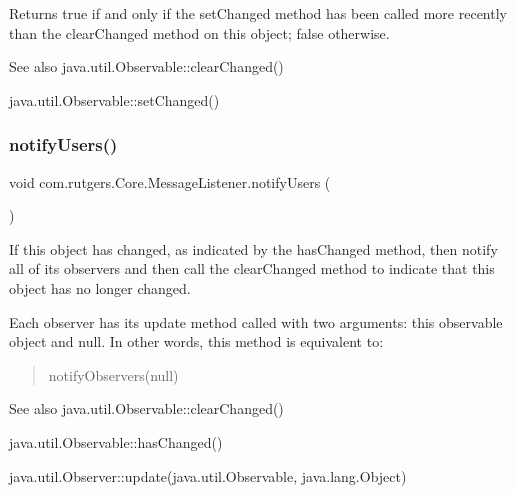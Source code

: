 \begin{DoxyReturn}{Returns}
{\ttfamily true} if and only if the {\ttfamily set\+Changed} method has been called more recently than the {\ttfamily clear\+Changed} method on this object; {\ttfamily false} otherwise. 
\end{DoxyReturn}
\begin{DoxySeeAlso}{See also}
java.\+util.\+Observable\+::clear\+Changed() 

java.\+util.\+Observable\+::set\+Changed() 
\end{DoxySeeAlso}
\mbox{\label{classcom_1_1rutgers_1_1Core_1_1MessageListener_a2da962a5db69e62ea529759b9f643851}} 
\subsubsection{\texorpdfstring{notify\+Users()}{notifyUsers()}\hspace{0.1cm}{\footnotesize\ttfamily [1/2]}}
{\footnotesize\ttfamily void com.\+rutgers.\+Core.\+Message\+Listener.\+notify\+Users (\begin{DoxyParamCaption}{ }\end{DoxyParamCaption})}

If this object has changed, as indicated by the {\ttfamily has\+Changed} method, then notify all of its observers and then call the {\ttfamily clear\+Changed} method to indicate that this object has no longer changed. 

Each observer has its {\ttfamily update} method called with two arguments\+: this observable object and {\ttfamily null}. In other words, this method is equivalent to\+: \begin{quote}
{\ttfamily  notify\+Observers(null)}\end{quote}


\begin{DoxySeeAlso}{See also}
java.\+util.\+Observable\+::clear\+Changed() 

java.\+util.\+Observable\+::has\+Changed() 

java.\+util.\+Observer\+::update(java.\+util.\+Observable, java.\+lang.\+Object) 
\end{DoxySeeAlso}
\mbox{\label{classcom_1_1rutgers_1_1Core_1_1MessageListener_a30277268e1459416379eefa0955db46b}} 
